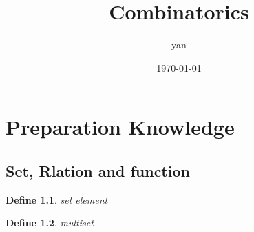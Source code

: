 \documentclass{book}
\title{Combinatorics}
\author{yan}
\date{\today}
\newtheorem{def}{Define}[chapter]
\begin{document}
\frontmatter
\maketitle
\tableofcontents
\part{Preparation Knowledge}
\chapter{Set, Rlation and function}
\begin{def}
  set
  element
\end{def}
\begin{def}
  multiset
\end{def}

\mainmatter
\end{document}

